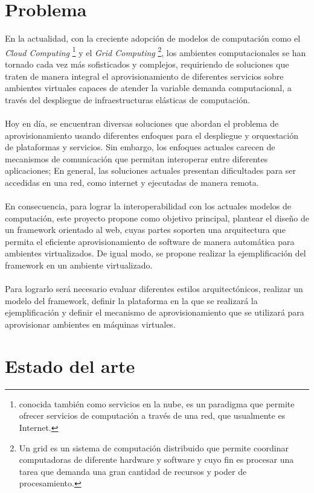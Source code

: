 \documentclass[conference, spanish]{IEEEtran}
\begin{document}
\section{Problema}
En la actualidad, con la creciente adopción de modelos de computación como el \emph{Cloud Computing} \footnote{conocida también como servicios en la nube, es un paradigma que permite ofrecer servicios de computación a través de una red, que usualmente es Internet.} y el \emph{Grid Computing} \footnote{Un grid es un sistema de computación distribuido que permite coordinar computadoras de diferente hardware y software y cuyo fin es procesar una tarea que demanda una gran cantidad de recursos y poder de procesamiento.}, los ambientes computacionales se han tornado cada vez más sofisticados y complejos, requiriendo de soluciones que traten de manera integral el aprovisionamiento de diferentes servicios sobre ambientes virtuales capaces de atender la variable demanda computacional, a través del despliegue de infraestructuras elásticas de computación.\\
\\
Hoy en día, se encuentran diversas soluciones que abordan el problema de aprovisionamiento usando diferentes enfoques para el despliegue y orquestación de plataformas y servicios. Sin embargo, los enfoques actuales carecen de mecanismos de comunicación que permitan interoperar entre diferentes aplicaciones; En general, las soluciones actuales presentan dificultades para ser accedidas en una red, como internet y ejecutadas de manera remota.\\
\\
En consecuencia, para lograr la interoperabilidad con los actuales modelos de computación, este proyecto propone como objetivo principal, plantear el diseño de un framework orientado al web, cuyas partes soporten una arquitectura que permita el eficiente aprovisionamiento de software de manera automática para ambientes virtualizados. De igual modo, se propone realizar la ejemplificación del framework en un ambiente virtualizado.\\
\\
Para lograrlo será necesario evaluar diferentes estilos arquitectónicos, realizar un modelo del framework, definir la plataforma en la que se realizará la ejemplificación y definir el mecanismo de aprovisionamiento que se utilizará para aprovisionar ambientes en máquinas virtuales.\\ 



\section{Estado del arte}
\end{document}
